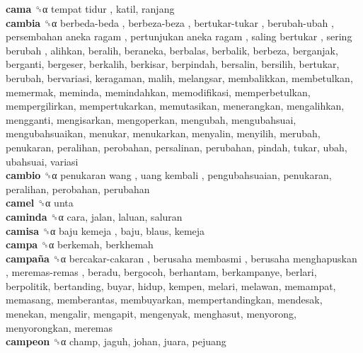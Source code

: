 \textbf{cama} ␝α   tempat tidur , katil, ranjang  \\
\textbf{cambia} ␝α   berbeda-beda ,  berbeza-beza ,  bertukar-tukar ,  berubah-ubah ,  persembahan aneka ragam ,  pertunjukan aneka ragam ,  saling bertukar ,  sering berubah , alihkan, beralih, beraneka, berbalas, berbalik, berbeza, berganjak, berganti, bergeser, berkalih, berkisar, berpindah, bersalin, bersilih, bertukar, berubah, bervariasi, keragaman, malih, melangsar, membalikkan, membetulkan, memermak, meminda, memindahkan, memodifikasi, memperbetulkan, mempergilirkan, mempertukarkan, memutasikan, menerangkan, mengalihkan, mengganti, mengisarkan, mengoperkan, mengubah, mengubahsuai, mengubahsuaikan, menukar, menukarkan, menyalin, menyilih, merubah, penukaran, peralihan, perobahan, persalinan, perubahan, pindah, tukar, ubah, ubahsuai, variasi  \\
\textbf{cambio} ␝α   penukaran wang ,  uang kembali , pengubahsuaian, penukaran, peralihan, perobahan, perubahan  \\
\textbf{camel} ␝α  unta  \\
\textbf{caminda} ␝α  cara, jalan, laluan, saluran  \\
\textbf{camisa} ␝α   baju kemeja , baju, blaus, kemeja  \\
\textbf{campa} ␝α  berkemah, berkhemah  \\
\textbf{campaña} ␝α   bercakar-cakaran ,  berusaha membasmi ,  berusaha menghapuskan ,  meremas-remas , beradu, bergocoh, berhantam, berkampanye, berlari, berpolitik, bertanding, buyar, hidup, kempen, melari, melawan, memampat, memasang, memberantas, membuyarkan, mempertandingkan, mendesak, menekan, mengalir, mengapit, mengenyak, menghasut, menyorong, menyorongkan, meremas  \\
\textbf{campeon} ␝α  champ, jaguh, johan, juara, pejuang  \\
